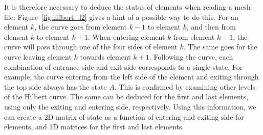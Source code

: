 It is therefore necessary to deduce the status of elements when reading a mesh file.
Figure~\ref{fig:hilbert_l2} gives a hint of a possible way to do this. For an element \(k\), the
curve goes from element \(k - 1\) to element \(k\), and then from element \(k\) to element \(k +
1\). When entering element \(k\) from element \(k - 1\), the curve will pass through one of the four
sides of element \(k\). The same goes for the curve leaving element \(k\) towards element \(k + 1\).
Following the curve, each combination of entrance side and exit side corresponds to a single state.
For example, the curve entering from the left side of the element and exiting through the top side
always has the state \(A\). This is confirmed by examining other levels of the Hilbert curve. The
same can be deduced for the first and last elements, using only the exiting and entering side,
respectively. Using this information, we can create a 2D matrix of state as a function of entering
and exiting side for elements, and 1D matrices for the first and last elements.

